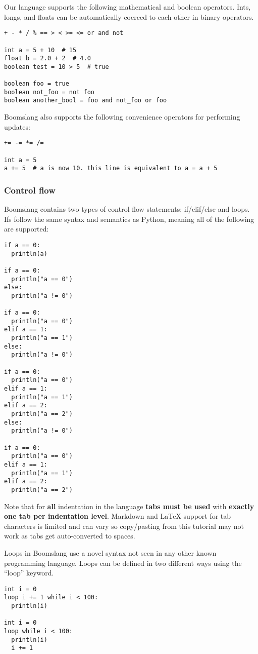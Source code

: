 \documentclass{article}
\begin{document}
Our language supports the following mathematical and boolean operators. Ints, longs, and floats can be automatically coerced to each other in binary operators.
\begin{verbatim}
+ - * / % == > < >= <= or and not

int a = 5 + 10  # 15
float b = 2.0 + 2  # 4.0
boolean test = 10 > 5  # true

boolean foo = true
boolean not_foo = not foo
boolean another_bool = foo and not_foo or foo
\end{verbatim}

Boomslang also supports the following convenience operators for performing updates:
\begin{verbatim}
+= -= *= /=

int a = 5
a += 5  # a is now 10. this line is equivalent to a = a + 5
\end{verbatim}

\subsubsection{Control flow}
Boomslang contains two types of control flow statements: if/elif/else and loops. Ifs follow the same syntax and semantics as Python, meaning all of the following are supported:
\begin{verbatim}
if a == 0:
  println(a)
    
if a == 0:
  println("a == 0")
else:
  println("a != 0")
    
if a == 0:
  println("a == 0")
elif a == 1:
  println("a == 1")
else:
  println("a != 0")
    
if a == 0:
  println("a == 0")
elif a == 1:
  println("a == 1")
elif a == 2:
  println("a == 2")
else:
  println("a != 0")
    
if a == 0:
  println("a == 0")
elif a == 1:
  println("a == 1")
elif a == 2:
  println("a == 2")
\end{verbatim}

Note that for \textbf{all} indentation in the language \textbf{tabs must be used} with \textbf{exactly one tab per indentation level}. Markdown and LaTeX support for tab characters is limited and can vary so copy/pasting from this tutorial may not work as tabs get auto-converted to spaces.

Loops in Boomslang use a novel syntax not seen in any other known programming language. Loops can be defined in two different ways using the ``loop'' keyword.
\begin{verbatim}
int i = 0
loop i += 1 while i < 100:
  println(i)
    
int i = 0
loop while i < 100:
  println(i)
  i += 1
\end{verbatim}
\end{document}
